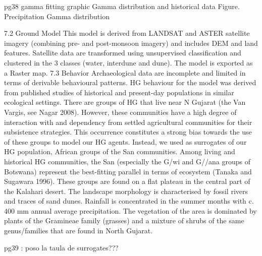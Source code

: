 pg38 gamma fitting graphic
Gamma distribution and historical data
Figure. Precipitation Gamma distribution

7.2 Ground Model
This model is derived from LANDSAT and ASTER satellite imagery (combining pre- and post-monsoon
imagery) and includes DEM and land features. Satellite data are transformed using unsupervised
classification and clustered in the 3 classes (water, interdune and dune). The model is exported as a
Raster map.
7.3 Behavior
Archaeological data are incomplete and limited in terms of derivable behavioural patterns. HG
behaviour for the model was derived from published studies of historical and present-day populations
in similar ecological settings. There are groups of HG that live near N Gujarat (the Van Vargis, see
Nagar 2008). However, these communities have a high degree of interaction with and dependency
from settled agricultural communities for their subsistence strategies. This occurrence constitutes a
strong bias towards the use of these groups to model our HG agents. Instead, we used as surrogates
of our HG population, African groups of the San communities.
Among living and historical HG communities, the San (especially the G/wi and G//ana groups of
Botswana) represent the best-fitting parallel in terms of ecosystem (Tanaka and Sugawara 1996).
These groups are found on a flat plateau in the central part of the Kalahari desert. The landscape
morphology is characterised by fossil rivers and traces of sand dunes. Rainfall is concentrated in the
summer months with c. 400 mm annual average precipitation. The vegetation of the area is dominated
by plants of the Gramineae family (grasses) and a mixture of shrubs of the same genus/families that
are found in North Gujarat.

pg39 : poso la taula de surrogates???

